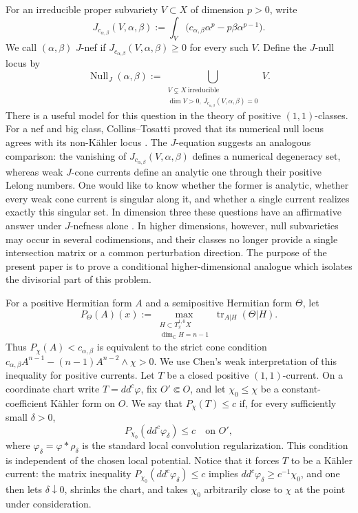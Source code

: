 \documentclass[reqno]{amsart}
\newcommand{\tr}{\operatorname{tr}}
\newcommand{\ddc}{dd^c}
\newcommand{\JNull}{\operatorname{Null}_{J}}
\newcommand{\cab}{c_{\alpha,\beta}}
\theoremstyle{plain}
\theoremstyle{remark}
\begin{document}
For an irreducible proper subvariety $V\subset X$ of dimension
$p>0$, write
\[
 J_{\cab}(V,\alpha,\beta)
 :=\int_V\bigl(\cab\alpha^p-p\beta\alpha^{p-1}\bigr).
\]
We call $(\alpha,\beta)$ $J$-nef if
$J_{\cab}(V,\alpha,\beta)\geq0$ for every such $V$.
Define the $J$-null locus by
\[
 \JNull(\alpha,\beta)
 :=\bigcup_{\substack{V\subsetneq X\ \text{irreducible}\\
 \dim V>0,\,
J_{\cab}(V,\alpha,\beta)=0}}V.
\]
There is a useful model for this question in the theory of positive
$(1,1)$-classes. For a nef and big class, Collins--Tosatti proved
that its numerical null locus agrees with its non-K\"ahler locus
\cite{CT15}. The $J$-equation suggests an analogous comparison:
the vanishing of $J_{\cab}(V,\alpha,\beta)$ defines a numerical
degeneracy set, whereas weak $J$-cone currents define an analytic
one through their positive Lelong numbers. One would like to know
whether the former is analytic, whether every weak cone current is
singular along it, and whether a single current realizes exactly this
singular set. In dimension three these questions have an affirmative
answer under $J$-nefness alone \cite{3d}. In higher
dimensions, however, null subvarieties may occur in several
codimensions, and their classes no longer provide a single
intersection matrix or a common perturbation direction. The purpose
of the present paper is to prove a conditional higher-dimensional
analogue which isolates the divisorial part of this problem.

For a positive Hermitian form $A$ and a semipositive Hermitian form
$\Theta$, let
\[
 P_\Theta(A)(x)
 :=\max_{\substack{H\subset T_x^{1,0}X\\
                   \dim_{\mathbb C}H=n-1}}
   \tr_{A|H}(\Theta|H).
\]
Thus $P_\chi(A)<\cab$ is equivalent to the strict cone condition $\cab A^{n-1}-(n-1)A^{n-2}\wedge\chi>0$. 
We use Chen's weak interpretation of this inequality for positive
currents. Let $T$ be a closed positive $(1,1)$-current. On a
coordinate chart write $T=\ddc\varphi$, fix $O'\Subset O$, and let
$\chi_0\leq\chi$ be a
constant-coefficient K\"ahler form on $O$. We say that
$P_\chi(T)\leq c$ if, for every sufficiently small $\delta>0$,
\[
 P_{\chi_0}(\ddc\varphi_\delta)\leq c\quad\text{on }O',
\]
where $\varphi_\delta=\varphi*\rho_\delta$ is the standard local
convolution regularization.
This condition is independent of the chosen local potential. Notice
that it forces $T$ to be a K\"ahler current: the matrix inequality
$P_{\chi_0}(\ddc\varphi_\delta)\leq c$ implies
$\ddc\varphi_\delta\geq c^{-1}\chi_0$, and one then lets
$\delta\downarrow0$, shrinks the chart, and takes $\chi_0$ arbitrarily
close to $\chi$ at the point under consideration.
\end{document}
